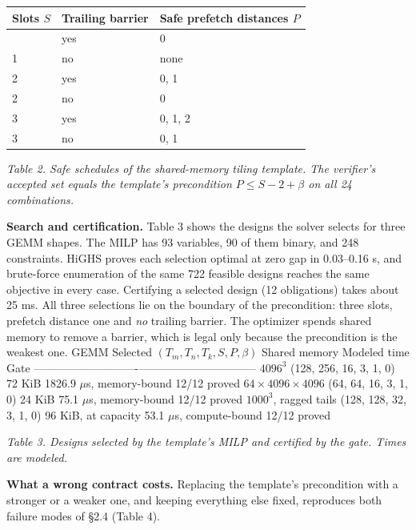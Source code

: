\documentclass[11pt]{article}
\begin{document}
\begin{longtable}[]{@{}lll@{}}
\toprule\noalign{}
Slots \(S\) & Trailing barrier & Safe prefetch distances \(P\) \\
\midrule\noalign{}
\endhead
\bottomrule\noalign{}
\endlastfoot
1 & yes & 0 \\
1 & no & none \\
2 & yes & 0, 1 \\
2 & no & 0 \\
3 & yes & 0, 1, 2 \\
3 & no & 0, 1 \\
\end{longtable}

\emph{Table 2. Safe schedules of the shared-memory tiling template. The verifier's accepted set equals the template's precondition \(P\le S-2+\beta\) on all 24 combinations.}

\textbf{Search and certification.} Table 3 shows the designs the solver selects for three GEMM shapes. The MILP has 93 variables, 90 of them binary, and 248 constraints. HiGHS proves each selection optimal at zero gap in 0.03--0.16 s, and brute-force enumeration of the same 722 feasible designs reaches the same objective in every case. Certifying a selected design (12 obligations) takes about 25 ms. All three selections lie on the boundary of the precondition: three slots, prefetch distance one and \emph{no} trailing barrier. The optimizer spends shared memory to remove a barrier, which is legal only because the precondition is the weakest one.
\textbar{} GEMM \textbar{} Selected \((T_m,T_n,T_k,S,P,\beta)\) \textbar{} Shared memory \textbar{} Modeled time \textbar{} Gate \textbar{}
\textbar------------\textbar----------------\textbar------------\textbar------------\textbar--------\textbar{}
\textbar{} \(4096^3\) \textbar{} (128, 256, 16, 3, 1, 0) \textbar{} 72 KiB \textbar{} 1826.9 \(\mu\)s, memory-bound \textbar{} 12/12 proved \textbar{}
\textbar{} \(64\times4096\times4096\) \textbar{} (64, 64, 16, 3, 1, 0) \textbar{} 24 KiB \textbar{} 75.1 \(\mu\)s, memory-bound \textbar{} 12/12 proved \textbar{}
\textbar{} \(1000^3\), ragged tails \textbar{} (128, 128, 32, 3, 1, 0) \textbar{} 96 KiB, at capacity \textbar{} 53.1 \(\mu\)s, compute-bound \textbar{} 12/12 proved \textbar{}

\emph{Table 3. Designs selected by the template's MILP and certified by the gate. Times are modeled.}

\textbf{What a wrong contract costs.} Replacing the template's precondition with a stronger or a weaker one, and keeping everything else fixed, reproduces both failure modes of §2.4 (Table 4).
\end{document}
